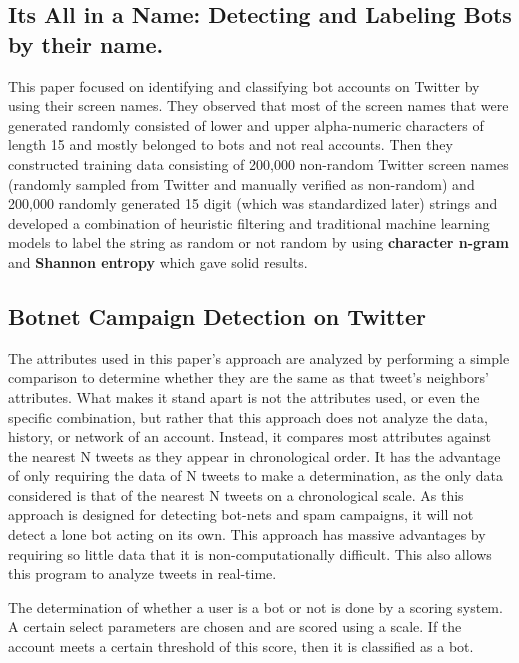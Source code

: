 \documentclass[a4paper, 12pt]{article}
\begin{document}
\subsection{Its All in a Name: Detecting and Labeling Bots by their name.}
\par
\hspace{1cm}  
This paper focused on identifying and classifying bot accounts on Twitter by using their screen names. They observed that most of the screen names that were generated randomly consisted of lower and upper alpha-numeric characters of length 15 and mostly belonged to bots and not real accounts. Then they constructed  training data consisting of 200,000 non-random Twitter screen names (randomly sampled from Twitter and manually veriﬁed as non-random) and 200,000 randomly generated 15 digit (which was standardized later) strings and developed a combination of heuristic ﬁltering and traditional machine learning models to label the string as random or not random by using \textbf{character n-gram} and \textbf{Shannon entropy} which gave solid results.


\subsection{Botnet Campaign Detection on Twitter}
\hspace{1cm}  
The attributes used in this paper's approach are analyzed by performing a simple comparison to determine whether they are the same as that tweet's neighbors' attributes. What makes it stand apart is not the attributes used, or even the speciﬁc combination, but rather that this approach does not analyze the data, history, or network of an account. Instead, it compares most attributes against the nearest N tweets as they appear in chronological order. It has the advantage of only requiring the data of N tweets to make a determination, as the only data considered is that of the nearest N tweets on a chronological scale. As this approach is designed for detecting bot-nets and spam campaigns, it will not detect a lone bot acting on its own. This approach has massive advantages by requiring so little data that it is non-computationally diﬃcult. This also allows this program to analyze tweets in real-time.
\par
\hspace{0.5cm}
The determination of whether a user is a bot or not is done by a scoring system. A certain select parameters are chosen and are scored using a scale. If the account meets a certain threshold of this score, then it is classified as a bot.
\end{document}
